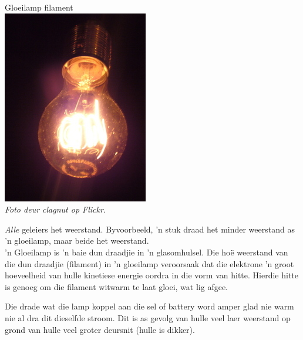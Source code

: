 
\begin{minipage}{.5\textwidth}
\begin{center}
Gloeilamp filament\\
\includegraphics[width=.55\textwidth]{photos/lightbulb_by_clagnut.jpg}\\
\textit{Foto deur clagnut op Flickr.}
\end{center}  
\end{minipage}
\begin{minipage}{.5\textwidth}

\textit{Alle} geleiers het weerstand. Byvoorbeeld, 'n stuk draad het
minder weerstand as 'n gloeilamp, maar beide het weerstand. \\

 'n Gloeilamp is 'n baie dun draadjie in 'n glasomhulsel. Die ho\"e weerstand van
die dun draadjie (filament) in 'n gloeilamp veroorsaak dat die elektrone 'n
groot hoeveelheid van hulle kinetiese energie oordra in die vorm van hitte.
Hierdie hitte is genoeg om die filament witwarm te laat gloei, wat lig afgee.

\end{minipage}

Die drade wat die lamp koppel aan die sel of battery word amper glad nie warm
nie al dra dit dieselfde stroom. Dit is as gevolg van hulle veel laer
weerstand op grond van hulle veel groter deursnit (hulle is dikker).

